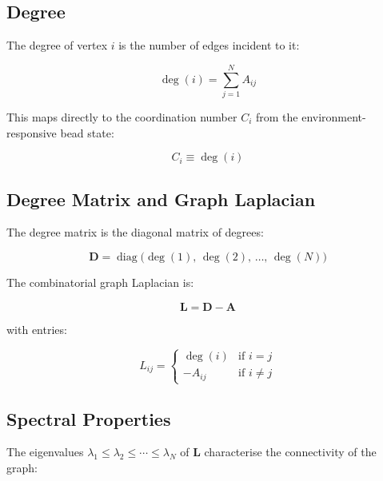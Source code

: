 \documentclass[11pt, a4paper, oneside]{article}
\DeclareMathOperator{\diag}{diag}
\begin{document}
\subsection{Degree}

The degree of vertex $i$ is the number of edges incident to it:

\begin{equation}
\deg(i) = \sum_{j=1}^{N} A_{ij}
\label{eq:degree}
\end{equation}

This maps directly to the coordination number $C_i$ from the
environment-responsive bead state:

\begin{equation}
C_i \equiv \deg(i)
\label{eq:C_is_degree}
\end{equation}

\subsection{Degree Matrix and Graph Laplacian}

The degree matrix is the diagonal matrix of degrees:

\begin{equation}
\mathbf{D} = \diag\bigl(\deg(1),\, \deg(2),\, \ldots,\, \deg(N)\bigr)
\label{eq:degree_matrix}
\end{equation}

The combinatorial graph Laplacian is:

\begin{equation}
\boxed{\mathbf{L} = \mathbf{D} - \mathbf{A}}
\label{eq:laplacian}
\end{equation}

with entries:

\begin{equation}
L_{ij} = \begin{cases}
  \deg(i) & \text{if } i = j \\[3pt]
  -A_{ij} & \text{if } i \neq j
\end{cases}
\label{eq:laplacian_entries}
\end{equation}

\subsection{Spectral Properties}

The eigenvalues $\lambda_1 \leq \lambda_2 \leq \cdots \leq \lambda_N$
of $\mathbf{L}$ characterise the connectivity of the graph:
\end{document}

